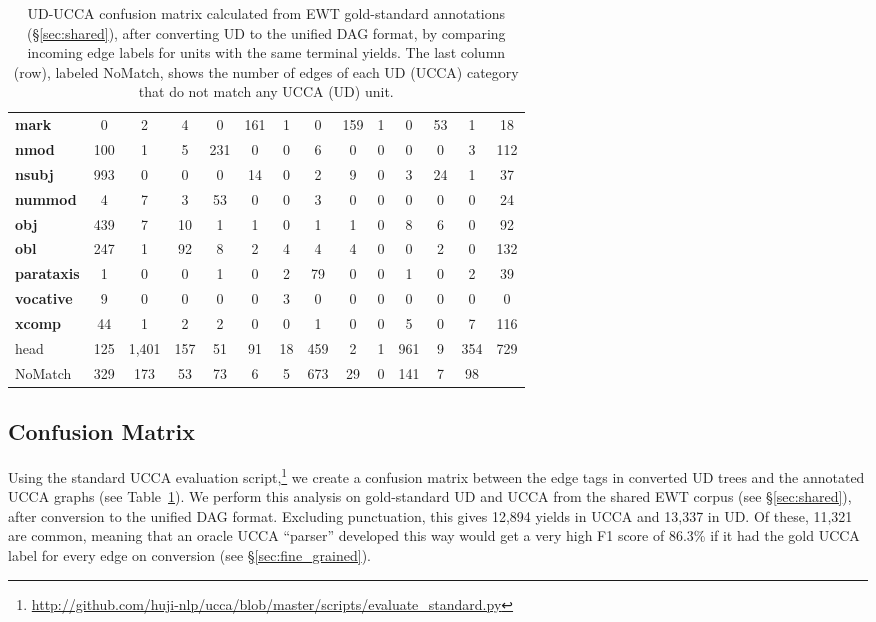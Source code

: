 \documentclass[11pt,a4paper]{article}
\begin{document}
\begin{table}[t]
\begin{tabular}{l|ccccccccccccc}
\bf mark & 0 & 2 & 4 & 0 & 161 & 1 & 0 & 159 & 1 & 0 & 53 & 1 & 18 \\
\bf nmod & 100 & 1 & 5 & 231 & 0 & 0 & 6 & 0 & 0 & 0 & 0 & 3 & 112 \\
\bf nsubj & 993 & 0 & 0 & 0 & 14 & 0 & 2 & 9 & 0 & 3 & 24 & 1 & 37 \\
\bf nummod & 4 & 7 & 3 & 53 & 0 & 0 & 3 & 0 & 0 & 0 & 0 & 0 & 24 \\
\bf obj & 439 & 7 & 10 & 1 & 1 & 0 & 1 & 1 & 0 & 8 & 6 & 0 & 92 \\
\bf obl & 247 & 1 & 92 & 8 & 2 & 4 & 4 & 4 & 0 & 0 & 2 & 0 & 132 \\
\bf parataxis & 1 & 0 & 0 & 1 & 0 & 2 & 79 & 0 & 0 & 1 & 0 & 2 & 39 \\
\bf vocative & 9 & 0 & 0 & 0 & 0 & 3 & 0 & 0 & 0 & 0 & 0 & 0 & 0 \\
\bf xcomp & 44 & 1 & 2 & 2 & 0 & 0 & 1 & 0 & 0 & 5 & 0 & 7 & 116 \\
\hline
head & 125 & 1,401 & 157 & 51 & 91 & 18 & 459 & 2 & 1 & 961 & 9 & 354 & 729 \\
{\sc NoMatch} & 329 & 173 & 53 & 73 & 6 & 5 & 673 & 29 & 0 & 141 & 7 & 98
\end{tabular}
\caption{UD-UCCA confusion matrix calculated from EWT
gold-standard annotations (\S\ref{sec:shared}),
after converting UD to the unified DAG format,
by comparing incoming edge labels for units with the same terminal yields.
The last column (row), labeled {\sc NoMatch}, shows the number of edges of each UD (UCCA) category
that do not match any UCCA (UD) unit.
\label{tab:confusion_matrix}}
\end{table}

\subsection{Confusion Matrix}\label{sec:confusion}

Using the standard UCCA evaluation
script,\footnote{\url{http://github.com/huji-nlp/ucca/blob/master/scripts/evaluate_standard.py}}
we create a confusion matrix between the edge tags in converted UD trees
and the annotated UCCA graphs (see Table~\ref{tab:confusion_matrix}).
We perform this analysis on gold-standard UD and UCCA from the shared EWT corpus
(see \S\ref{sec:shared}),
after conversion to the unified DAG format.
Excluding punctuation, this gives 12,894 yields in UCCA and
13,337 in UD.
Of these, 11,321 are common, meaning that an oracle UCCA ``parser'' developed this way
would get a very high F1 score
of 86.3\% if it had the gold UCCA label for every edge on conversion
(see \S\ref{sec:fine_grained}).
\end{document}
